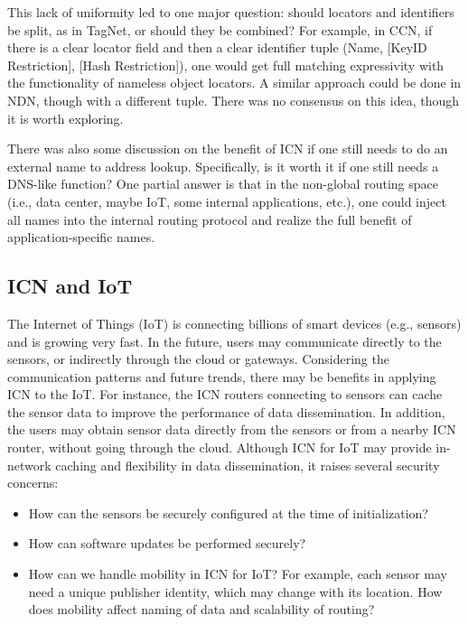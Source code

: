 This lack of uniformity led to one major question: should locators and identifiers
be split, as in TagNet, or should they be combined? For example, in CCN, if there is a clear locator
field and then a clear identifier tuple (Name, [KeyID Restriction], [Hash Restriction]),
one would get full matching expressivity with the functionality of nameless object locators.
A similar approach could be done in NDN, though with a different tuple.  There was no
consensus on this idea, though it is worth exploring.

There was also some discussion on the benefit of ICN if one still needs to do an external
name to address lookup. Specifically, is it worth it if one still needs a DNS-like function?
One partial answer is that in the non-global routing space (i.e., data center, maybe IoT, some internal
applications, etc.), one could inject all names into the internal routing protocol and realize
the full benefit of application-specific names.

\subsection{ICN and IoT}
The Internet of Things (IoT) is connecting billions of smart devices (e.g., sensors) and is growing
very fast. In the future, users may communicate directly to the sensors, or indirectly through the cloud or gateways.
Considering the communication patterns and future trends, there may be benefits in applying ICN to the IoT. For instance,
the ICN routers connecting to sensors can cache the sensor data to improve the performance of data
dissemination. In addition, the users may obtain sensor data directly from the sensors or from a
nearby ICN router, without going through the cloud. Although ICN for IoT may provide in-network
caching and flexibility in data dissemination, it raises several security concerns:

\begin{itemize}
\item How can the sensors be securely configured at the time of initialization?
\item How can software updates be performed securely?
\item How can we handle mobility in ICN for IoT? For example, each sensor may need a unique publisher
identity, which may change with its location. How does mobility affect naming of data and scalability of routing?
\end{itemize}

